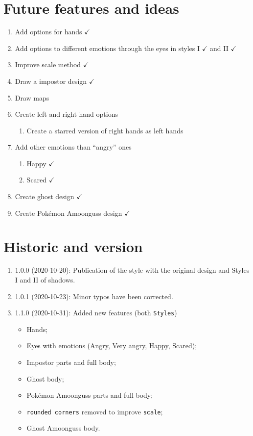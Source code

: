 \documentclass[12pt]{article}
\newenvironment{FHZtcbEnumerate}{%
  \begin{FHZboxEnumerateStyle}\begin{enumerate}}
    {\end{enumerate}\end{FHZboxEnumerateStyle}
}
\begin{document}
\section{Future features and ideas}

\begin{FHZtcbEnumerate}
  \item Add options for hands $\checkmark$
  \item Add options to different emotions through the eyes in styles I $\checkmark$ and II $\checkmark$
  \item Improve scale method $\checkmark$
  \item Draw a impostor design $\checkmark$
  \item Draw maps
  \item Create left and right hand options
  \begin{enumerate}
    \item Create a starred version of right hands as left hands
  \end{enumerate}
  \item Add other emotions than ``angry'' ones
  \begin{enumerate}
    \item Happy $\checkmark$
    \item Scared $\checkmark$
  \end{enumerate}
  \item Create ghost design $\checkmark$
  \item Create Pokémon Amoonguss design $\checkmark$
\end{FHZtcbEnumerate}

\section{Historic and version}

\begin{FHZtcbEnumerate}[leftmargin=3.5cm]
  \item[1.0.0 (2020-10-20):] Publication of the style with the original design and Styles I and II of shadows.
  \item[1.0.1 (2020-10-23):] Minor typos have been corrected.
  \item[1.1.0 (2020-10-31):] Added new features (both \texttt{Styles})
    \begin{itemize}[leftmargin=-2cm]
      \item Hands;
      \item Eyes with emotions (Angry, Very angry, Happy, Scared);
      \item Impostor parts and full body;
      \item Ghost body;
      \item Pokémon Amoonguss parts and full body;
      \item \texttt{rounded corners} removed to improve \texttt{scale};
      \item Ghost Amoonguss body.
    \end{itemize}
\end{FHZtcbEnumerate}
\end{document}
